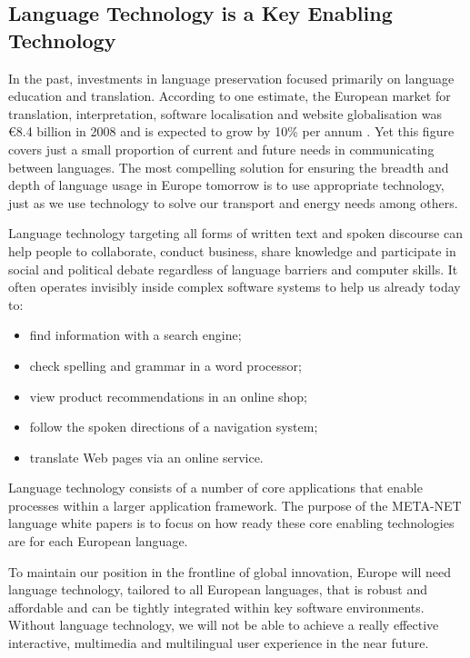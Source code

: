 \begin{multicols}{2}
\subsection{Language Technology is a Key Enabling Technology}

In the past, investments in language preservation focused primarily on language education and translation. According to one estimate, the European market for translation, interpretation, software localisation and website globalisation was €8.4 billion in 2008 and is expected to grow by 10\% per annum \cite{EC3}. Yet this figure covers just a small proportion of current and future needs in communicating between languages. The most compelling solution for ensuring the breadth and depth of language usage in Europe tomorrow is to use appropriate technology, just as we use technology to solve our transport and energy needs among others.

Language technology targeting all forms of written text and spoken discourse can help people to collaborate, conduct business, share knowledge and participate in social and political debate regardless of language barriers and computer skills. It often operates invisibly inside complex software systems to help us already today to:

\begin{itemize}
\item find information with a search engine;
\item check spelling and grammar in a word processor;
\item view product recommendations in an online shop;
\item follow the spoken directions of a navigation system;
\item translate Web pages via an online service.
\end{itemize}

Language technology consists of a number of core applications that enable processes within a larger application framework. The purpose of the META-NET language white papers is to focus on how ready these core enabling technologies are for each European language. 


To maintain our position in the frontline of global innovation, Europe will need language technology, tailored to all European languages, that is robust and affordable and can be tightly integrated within key software environments. Without language technology, we will not be able to achieve a really effective interactive, multimedia and multilingual user experience in the near future.


\end{multicols}
